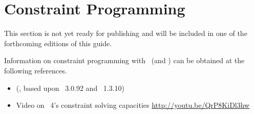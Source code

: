 \section{Constraint Programming}\label{sec:constraint}

This section is not yet ready for publishing
and will be included in one of the forthcoming editions of this guide.

Information on constraint programming with \gringo\ (and \clingcon) can be obtained at the following references.

\begin{itemize}
\item \cite{geossc09a,ostsch12a} (\clingcon, based upon \gringo~3.0.92 and \clasp~1.3.10)
\item Video on \gringo~4's constraint solving capacities \url{http://youtu.be/QrP8KiDl3hw}
\end{itemize}

